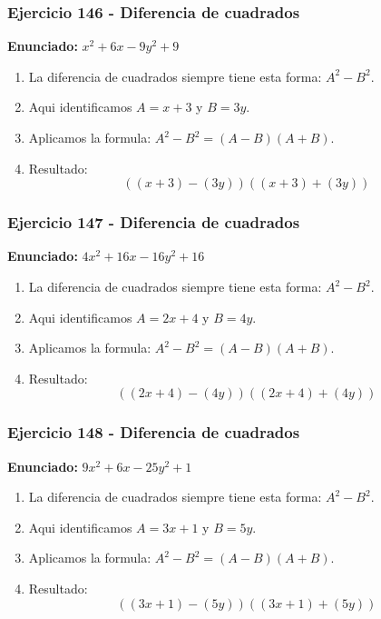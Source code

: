 \documentclass[11pt,a4paper]{article}
\begin{document}
\vspace{0.2cm}
\subsubsection*{Ejercicio 146 - Diferencia de cuadrados}
\textbf{Enunciado:} $ x^{2} + 6 x - 9 y^{2} + 9 $\par
\begin{enumerate}[leftmargin=2em]
\item La diferencia de cuadrados siempre tiene esta forma: \(A^2-B^2\).
\item Aqui identificamos \(A=x + 3\) y \(B=3 y\).
\item Aplicamos la formula: \(A^2-B^2=(A-B)(A+B)\).
\item Resultado: \[\boxed{\left(\left(x + 3\right)-\left(3 y\right)\right)\left(\left(x + 3\right)+\left(3 y\right)\right)}\]
\end{enumerate}

\vspace{0.2cm}
\subsubsection*{Ejercicio 147 - Diferencia de cuadrados}
\textbf{Enunciado:} $ 4 x^{2} + 16 x - 16 y^{2} + 16 $\par
\begin{enumerate}[leftmargin=2em]
\item La diferencia de cuadrados siempre tiene esta forma: \(A^2-B^2\).
\item Aqui identificamos \(A=2 x + 4\) y \(B=4 y\).
\item Aplicamos la formula: \(A^2-B^2=(A-B)(A+B)\).
\item Resultado: \[\boxed{\left(\left(2 x + 4\right)-\left(4 y\right)\right)\left(\left(2 x + 4\right)+\left(4 y\right)\right)}\]
\end{enumerate}

\vspace{0.2cm}
\subsubsection*{Ejercicio 148 - Diferencia de cuadrados}
\textbf{Enunciado:} $ 9 x^{2} + 6 x - 25 y^{2} + 1 $\par
\begin{enumerate}[leftmargin=2em]
\item La diferencia de cuadrados siempre tiene esta forma: \(A^2-B^2\).
\item Aqui identificamos \(A=3 x + 1\) y \(B=5 y\).
\item Aplicamos la formula: \(A^2-B^2=(A-B)(A+B)\).
\item Resultado: \[\boxed{\left(\left(3 x + 1\right)-\left(5 y\right)\right)\left(\left(3 x + 1\right)+\left(5 y\right)\right)}\]
\end{enumerate}
\end{document}
